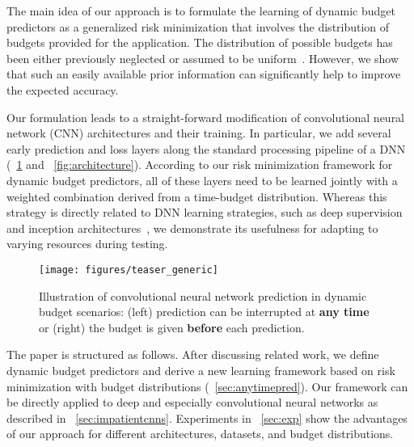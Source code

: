 \documentclass{bmvc2k}
\begin{document}
The main idea of our approach is to formulate the learning of dynamic budget predictors as a generalized risk minimization that involves
the distribution of budgets provided for the application. The distribution of possible budgets has been either previously neglected
or assumed to be uniform~\cite{karayev2014anytime}. However, we show that such an easily available prior information
can significantly help to improve the expected accuracy.

Our formulation leads to a straight-forward modification of convolutional neural network (CNN)
architectures and their training. In particular, we add several early prediction and loss layers along the standard processing pipeline of a DNN (\figurename~\ref{fig:teaser} and \figurename~\ref{fig:architecture}). 
According to our risk minimization framework for dynamic budget predictors, all of these layers need to be learned jointly with a weighted combination derived from a time-budget distribution. Whereas this strategy is directly related to DNN learning strategies, such as deep supervision~\cite{wang2015training} and
inception architectures~\cite{szegedy2015going}, we demonstrate its usefulness for adapting to varying resources during testing.

\begin{figure}
    \centering
    \texttt{[image: figures/teaser\_generic]}
    \caption{Illustration of convolutional neural network prediction in dynamic budget scenarios: (left) prediction can be interrupted at \textbf{any time} or (right) the budget is given \textbf{before} each prediction.}
    \label{fig:teaser}
\end{figure}

The paper is structured as follows. After discussing related work, we define dynamic budget 
predictors and derive a new learning framework based on risk minimization with budget distributions 
(\sectionname~\ref{sec:anytimepred}). Our framework can be directly applied to deep and especially convolutional neural networks
as described in \sectionname~\ref{sec:impatientcnns}. Experiments in \sectionname~\ref{sec:exp} show
the advantages of our approach for different architectures, datasets, and budget distributions.
\end{document}

